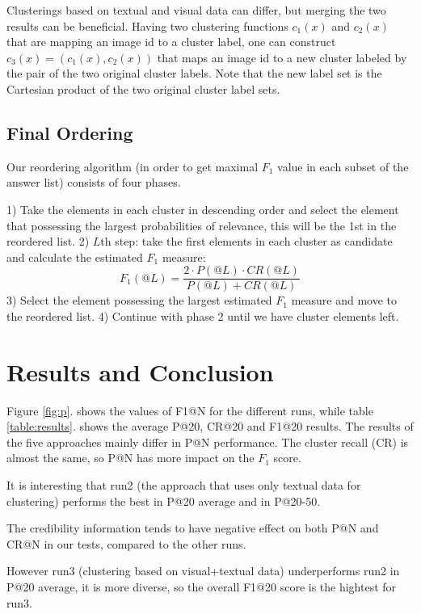 \documentclass{acm_proc_article-me}
\begin{document}
Clusterings based on textual and visual data can differ, but merging the two results can be beneficial. Having two clustering functions $c_1(x)$ and $c_2(x)$ that are mapping an image id to a cluster label, one can construct $c_3(x) = (c_1(x), c_2(x))$ that maps an image id to a new cluster labeled by the pair of the two original cluster labels. Note that the new label set is the Cartesian product of the two original cluster label sets.

\subsection{Final Ordering}

Our reordering algorithm (in order to get maximal $F_1$ value in each subset of the answer list) consists of four phases.

1) Take the elements in each cluster in descending order and select the element that possessing the largest probabilities of relevance, this will be the 1st in the reordered list.
2) $L$th step: take the first elements in each cluster as candidate and calculate the estimated $F_1$ measure: $$F_1(@L) = \frac{2 \cdot P(@L) \cdot CR(@L)}{P(@L) + CR(@L)}$$
3) Select the element possessing the largest estimated $F_1$ measure and move to the reordered list.
4) Continue with phase 2 until we have cluster elements left.

\section{Results and Conclusion}

Figure \ref{fig:p}. shows the values of F1@N for the different runs, while table \ref{table:results}. shows the average P@20, CR@20 and F1@20 results. The results of the five approaches mainly differ in P@N performance. The cluster recall (CR) is almost the same, so P@N has more impact on the $F_1$ score.

It is interesting that run2 (the approach that uses only textual data for clustering) performs the best in P@20 average and in P@20-50.

The credibility information tends to have negative effect on both P@N and CR@N in our tests, compared to the other runs.

However run3 (clustering based on visual+textual data) underperforms run2 in P@20 average, it is more diverse, so the overall F1@20 score is the hightest for run3.
\end{document}
